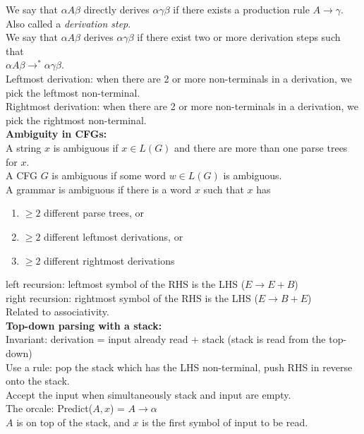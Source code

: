 \documentclass[12pt]{article}
\begin{document}
\noindent
We say that $\alpha A \beta$ directly derives $\alpha \gamma \beta$ if there exists a production rule $A \rightarrow \gamma$. Also called a \emph{derivation step}. \\
We say that $\alpha A \beta$ derives $\alpha \gamma \beta$ if there exist two or more derivation steps such that \\
$\alpha A \beta \rightarrow^{\ast} \alpha \gamma \beta$. \\

\noindent
Leftmost derivation: when there are 2 or more non-terminals in a derivation, we pick the leftmost non-terminal.\\
Rightmost derivation: when there are 2 or more non-terminals in a derivation, we pick the rightmost non-terminal.\\

\noindent
\textbf{Ambiguity in CFGs:}\\

\noindent
A string $x$ is ambiguous if $x \in L(G)$ and there are more than one parse trees for $x$.\\
A CFG $G$ is ambiguous if some word $w\in L(G)$ is ambiguous. \\
A grammar is ambiguous if there is a word $x$ such that $x$ has 
\begin{enumerate}
	\item $\geq 2$ different parse trees, or
	\item $\geq 2$ different leftmost derivations, or
	\item $\geq 2$ different rightmost derivations
\end{enumerate}
left recursion: leftmost symbol of the RHS is the LHS ($E \rightarrow E + B$)\\
right recursion: rightmost symbol of the RHS is the LHS ($ E \rightarrow B + E$)\\
Related to associativity.\\

\noindent
\textbf{Top-down parsing with a stack:}\\

\noindent
Invariant: derivation = input already read + stack (stack is read from the top-down)\\
Use a rule: pop the stack which has the LHS non-terminal, push RHS in reverse onto the stack.\\
Accept the input when simultaneously stack and input are empty. \\
The orcale: Predict($A, x$) = $A \rightarrow \alpha$\\
$A$ is on top of the stack, and $x$ is the first symbol of input to be read. \\
\end{document}

